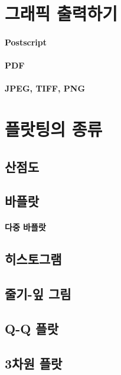 \documentclass{report}
\begin{document}
\section{그래픽 출력하기}
\paragraph{Postscript}
\paragraph{PDF}
\paragraph{JPEG, TIFF, PNG}

\section{플랏팅의 종류}

\subsection{산점도}
\subsection{바플랏}
\paragraph{다중 바플랏}
\subsection{히스토그램}
\subsection{줄기-잎 그림}
\subsection{Q-Q 플랏}
\subsection{3차원 플랏}
\end{document}
